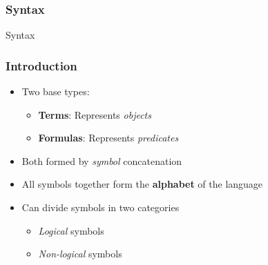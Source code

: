 \documentclass{beamer}
\begin{document}
            \subsubsection{Syntax}
                \begin{frame}
                    \vspace*{1cm}
                    \begin{center}
                        \begin{Huge}
                            \textcolor{title_blue}{Syntax}
                        \end{Huge}
                    \end{center}
                \end{frame}

                \begin{frame}
                    \frametitle{Introduction}
                    \begin{itemize}
                        \item Two base types:
                            \begin{itemize}
                                \item \textbf{Terms}: Represents \textit{objects}
                                \item \textbf{Formulas}: Represents \textit{predicates}
                            \end{itemize}
                        \item Both formed by \textit{symbol} concatenation
                        \item All symbols together form the \textbf{alphabet} of the language
                        \item Can divide symbols in two categories
                            \begin{itemize}
                                \item \textit{Logical} symbols
                                \item \textit{Non-logical} symbols
                            \end{itemize}
                    \end{itemize}
                \end{frame}
\end{document}
